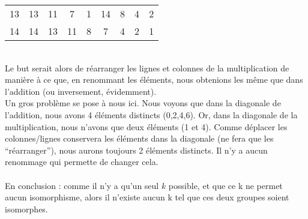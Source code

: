 \documentclass[10p,a4paper]{scrartcl}
\begin{document}
\begin{enumerate}
\begin{tabular}{r|cccccccc}
				13 & 13 & 11 & 7 & 1 & 14 & 8 & 4 & 2\\
				14 & 14 & 13 & 11 & 8 & 7 & 4 & 2 & 1
			\end{tabular}\\
			Le but serait alors de réarranger les lignes et colonnes de la multiplication de manière à ce que, en renommant les éléments, nous obtenions les même que dans l'addition (ou inversement, évidemment).\\
			Un gros problème se pose à nous ici. Nous voyons que dans la diagonale de l'addition, nous avons 4 éléments distincts (0,2,4,6). Or, dans la diagonale de la multiplication, nous n'avons que deux éléments (1 et 4). Comme déplacer les colonnes/lignes conservera les éléments dans la diagonale (ne fera que les \enquote{réarranger}), nous aurons toujours 2 éléments distincts. Il n'y a aucun renommage qui permette de changer cela.\\
			\\
			En conclusion : comme il n'y a qu'un seul $k$ possible, et que ce k ne permet aucun isomorphisme, alors il n'existe aucun k tel que ces deux groupes soient isomorphes.
\end{enumerate}
\end{document}
